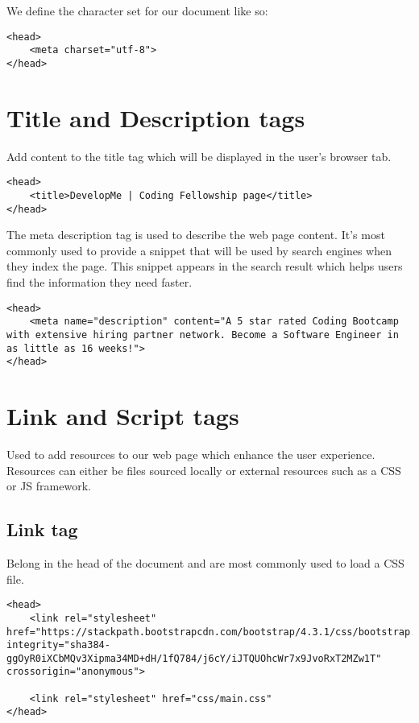 We define the character set for our document like so:

\begin{verbatim}
<head>
    <meta charset="utf-8">
</head>
\end{verbatim}

\section{Title and Description tags}

Add content to the title tag which will be displayed in the user's browser tab.

\begin{verbatim}
<head>
    <title>DevelopMe | Coding Fellowship page</title>
</head>
\end{verbatim}

The meta description tag is used to describe the web page content. It's most commonly used to provide a snippet that will be used by search engines when they index the page. This snippet appears in the search result which helps users find the information they need faster.

\begin{verbatim}
<head>
    <meta name="description" content="A 5 star rated Coding Bootcamp with extensive hiring partner network. Become a Software Engineer in as little as 16 weeks!">
</head>
\end{verbatim}

\section{Link and Script tags}

Used to add resources to our web page which enhance the user experience. Resources can either be files sourced locally or external resources such as a CSS or JS framework.

\subsection{Link tag}

Belong in the head of the document and are most commonly used to load a CSS file.

\begin{verbatim}
<head>
    <link rel="stylesheet" href="https://stackpath.bootstrapcdn.com/bootstrap/4.3.1/css/bootstrap.min.css" integrity="sha384-ggOyR0iXCbMQv3Xipma34MD+dH/1fQ784/j6cY/iJTQUOhcWr7x9JvoRxT2MZw1T" crossorigin="anonymous">

    <link rel="stylesheet" href="css/main.css"
</head>
\end{verbatim}

